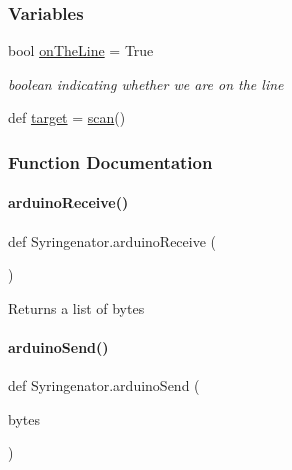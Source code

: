 \subsubsection*{Variables}
\begin{DoxyCompactItemize}
\item 
bool \mbox{\hyperlink{namespaceSyringenator_a161fa877b77c9ebb120c1ed20739260b}{on\+The\+Line}} = True
\begin{DoxyCompactList}\small\item\em boolean indicating whether we are on the line \end{DoxyCompactList}\item 
def \mbox{\hyperlink{namespaceSyringenator_a66c7999289f77a4adce05169661f9660}{target}} = \mbox{\hyperlink{namespaceSyringenator_aff01237d3ff3e33f0ffc32927d813df0}{scan}}()
\end{DoxyCompactItemize}


\subsubsection{Function Documentation}
\mbox{\label{namespaceSyringenator_a1c5a8cf020e400c8c0337977a5b6d921}} 
\paragraph{\texorpdfstring{arduinoReceive()}{arduinoReceive()}}
{\footnotesize\ttfamily def Syringenator.\+arduino\+Receive (\begin{DoxyParamCaption}{ }\end{DoxyParamCaption})}

\begin{DoxyReturn}{Returns}
a list of bytes 
\end{DoxyReturn}
\mbox{\label{namespaceSyringenator_ae7978d5b84170226249d8de2e204e762}} 
\paragraph{\texorpdfstring{arduinoSend()}{arduinoSend()}}
{\footnotesize\ttfamily def Syringenator.\+arduino\+Send (\begin{DoxyParamCaption}\item[{}]{bytes }\end{DoxyParamCaption})}


